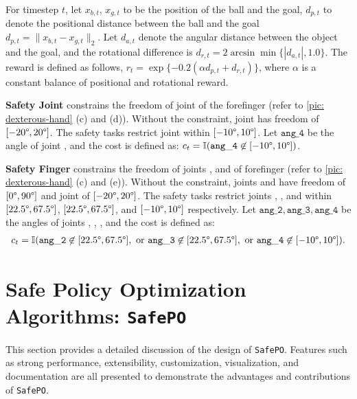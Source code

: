 \documentclass{article}
\begin{document}
For timestep $t$, let $x_{b,t}$, $x_{g,t}$ to be the position of the ball and the goal, $d_{p,t}$ to denote the positional distance between the ball and the goal $d_{p,t}=\|x_{b,t}-x_{g,t}\|_2$. Let $d_{a,t}$ denote the angular distance between the object and the goal, and the rotational difference is $d_{r,t}=2\arcsin \min\{|d_{a,t}|,1.0\}$. The reward is defined as follows, $r_{t}=\exp\{-0.2(\alpha d_{p,t}+d_{r,t})\}$, where $\alpha$ is a constant balance of positional and rotational reward.

\textbf{Safety Joint} constrains the freedom of joint  of the forefinger (refer to \autoref{pic: dexterous-hand} (c) and (d)). Without the constraint, joint  has freedom of $[-20\degree,20\degree]$. The safety tasks restrict joint  within $[-10\degree, 10\degree]$. Let $\mathtt{ang\_4}$ be the angle of joint ,
and the cost is defined as:
$c_t=\mathbb{I}(\mathtt{ang\_4}\not\in [-10\degree, 10\degree])$.

\textbf{Safety Finger} constrains the freedom of joints  ,   and  of forefinger (refer to \autoref{pic: dexterous-hand} (c) and (e)). Without the constraint, joints  and  have freedom of $[0\degree,90\degree]$ and joint  of $[-20\degree,20\degree]$. The safety tasks restrict joints , , and  within $[22.5\degree, 67.5\degree]$, $[22.5\degree, 67.5\degree]$, and $[-10\degree, 10\degree]$ respectively.
Let $\mathtt{ang\_2},\mathtt{ang\_3}, \mathtt{ang\_4}$ be the angles of joints ,  , , and the cost is defined as:
\begin{align}
c_t=\mathbb{I}(
\mathtt{ang\_2}\not\in [22.5\degree,67.5\degree],
~\text{or}~
\mathtt{ang\_3}\not\in [22.5\degree,67.5\degree],
~\text{or}~
\mathtt{ang\_4}\not\in [-10\degree,10\degree]
).
\end{align}


\section{Safe Policy Optimization Algorithms: \texttt{SafePO}}
\label{sec:algo}
This section provides a detailed discussion of the design of \texttt{SafePO}. Features such as strong performance, extensibility, customization, visualization, and documentation are all presented to demonstrate the advantages and contributions of \texttt{SafePO}.
\end{document}
